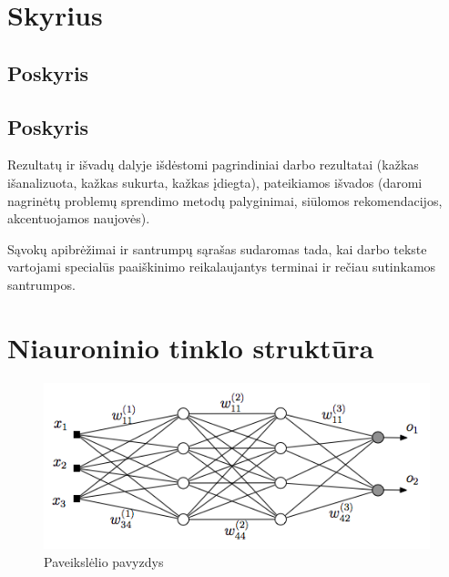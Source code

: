 \documentclass{VUMIFPSmagistrinis}
\begin{document}
\section{Skyrius}
\subsection{Poskyris}
\subsection{Poskyris}

Rezultatų ir išvadų dalyje išdėstomi pagrindiniai darbo rezultatai (kažkas
išanalizuota, kažkas sukurta, kažkas įdiegta), pateikiamos išvados (daromi
nagrinėtų problemų sprendimo metodų palyginimai, siūlomos rekomendacijos,
akcentuojamos naujovės).

\printbibliography[heading=bibintoc]  %

Sąvokų apibrėžimai ir santrumpų sąrašas sudaromas tada, kai darbo tekste
vartojami specialūs paaiškinimo reikalaujantys terminai ir rečiau sutinkamos
santrumpos.

\appendix  %

\section{Niauroninio tinklo struktūra}
\begin{figure}[H]
    \centering
    \includegraphics[scale=0.5]{img/MLP}
    \caption{Paveikslėlio pavyzdys}
    \label{img:mlp}
\end{figure}
\end{document}
